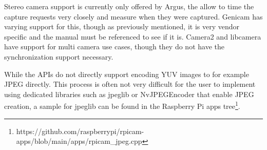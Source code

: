 Stereo camera support is currently only offered by Argus, the allow
to time the capture requests very closely and measure when they were captured.
Genicam has varying support for this, though as previously mentioned, it is very
vendor specific and the manual must be referenced to see if it is. Camera2 and
libcamera have support for multi camera use cases, though they do not have the
synchronization support necessary.

While the APIs do not directly support encoding YUV images to for example JPEG
directly. This process is often not very difficult for the user to implement
using dedicated libraries such as jpeglib or NvJPEGEncoder that enable JPEG
creation, a sample for jpeglib can be found in the Raspberry Pi apps
tree\footnote{https://github.com/raspberrypi/rpicam-apps/blob/main/apps/rpicam\_jpeg.cpp}.

